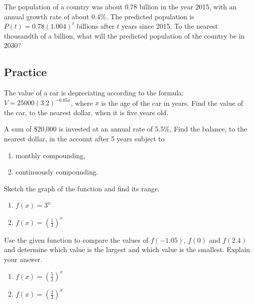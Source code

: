 \begin{example}

The population of a country was about 0.78 billion in the year 2015,
with an annual growth rate of about 0.4\%. The predicted population is
\(P(t)=0.78(1.004)^t\) billions after \(t\) years since 2015. To the
nearest thousandth of a billion, what will the predicted population of
the country be in 2030?

\end{example}

\subsection{Practice}

\begin{exercise}

The value of a car is depreciating according to the formula:
\(V=25000(3.2)^{-0.05x}\), where \(x\) is the age of the car in years.
Find the value of the car, to the nearest dollar, when it is five years
old.

\end{exercise}

\begin{exercise}

A sum of \$20,000 is invested at an annual rate of 5.5\%, Find the
balance, to the nearest dollar, in the account after 5 years subject to

\begin{enumerate}
\item
  monthly compounding,
\item
  continuously compounding.
\end{enumerate}

\end{exercise}

\begin{exercise}

Sketch the graph of the function and find its range.

\begin{enumerate}
\item
  \(f(x)=3^x\)
\item
  \(f(x)=\left(\frac13\right)^x\)
\end{enumerate}

\end{exercise}

\begin{exercise}

Use the given function to compare the values of \(f(-1.05)\), \(f(0)\)
and \(f(2.4)\) and determine which value is the largest and which value
is the smallest. Explain your answer.

\begin{enumerate}
\item
  \(f(x)=\left(\frac{5}{2}\right)^x\)
\item
  \(f(x)=\left(\frac23\right)^x\)
\end{enumerate}

\end{exercise}

